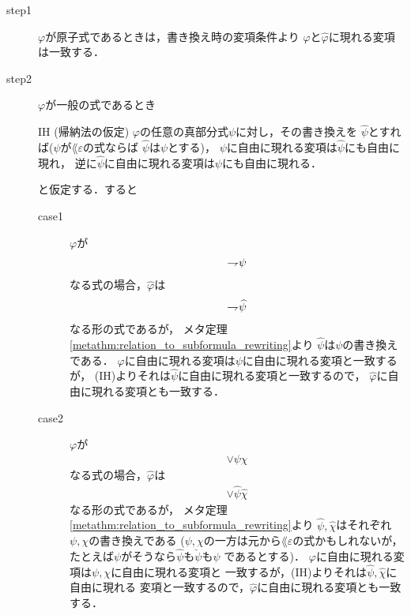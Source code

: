 	\begin{metaprf}\mbox{}
		\begin{description}
			\item[step1] $\varphi$が原子式であるときは，書き換え時の変項条件より
				$\varphi$と$\widehat{\varphi}$に現れる変項は一致する．
			
			\item[step2]
				$\varphi$が一般の式であるとき
				\begin{itembox}[l]{IH (帰納法の仮定)}
					$\varphi$の任意の真部分式$\psi$に対し，その書き換えを
					$\widehat{\psi}$とすれば($\psi$が$\lang{\varepsilon}$の式ならば
					$\widehat{\psi}$は$\psi$とする)，
					$\psi$に自由に現れる変項は$\widehat{\psi}$にも自由に現れ，
					逆に$\widehat{\psi}$に自由に現れる変項は$\psi$にも自由に現れる．
				\end{itembox}
				と仮定する．すると
				\begin{description}
					\item[case1] $\varphi$が
						\begin{align}
							\rightharpoondown\hspace{-0.25em} \psi
						\end{align}
						なる式の場合，$\widehat{\varphi}$は
						\begin{align}
							\rightharpoondown\hspace{-0.25em} \widehat{\psi}
						\end{align}
						なる形の式であるが，
						メタ定理\ref{metathm:relation_to_subformula_rewriting}より
						$\widehat{\psi}$は$\psi$の書き換えである．
						$\varphi$に自由に現れる変項は$\psi$に自由に現れる変項と一致するが，
						(IH)よりそれは$\widehat{\psi}$に自由に現れる変項と一致するので，
						$\widehat{\varphi}$に自由に現れる変項とも一致する．
						
					\item[case2] $\varphi$が
						\begin{align}
							\vee \psi \chi
						\end{align}
						なる式の場合，$\widehat{\varphi}$は
						\begin{align}
							\vee \widehat{\psi} \widehat{\chi}
						\end{align}
						なる形の式であるが，
						メタ定理\ref{metathm:relation_to_subformula_rewriting}より
						$\widehat{\psi},\widehat{\chi}$はそれぞれ$\psi,\chi$の書き換えである
						($\psi,\chi$の一方は元から$\lang{\varepsilon}$の式かもしれないが，
						たとえば$\psi$がそうなら$\widehat{\psi}$も$\check{\psi}$も$\psi$
						であるとする)．
						$\varphi$に自由に現れる変項は$\psi,\chi$に自由に現れる変項と
						一致するが，(IH)よりそれは$\widehat{\psi},\widehat{\chi}$に自由に現れる
						変項と一致するので，$\widehat{\varphi}$に自由に現れる変項とも一致する．
					

\end{description}
\end{description}
\end{metaprf}
